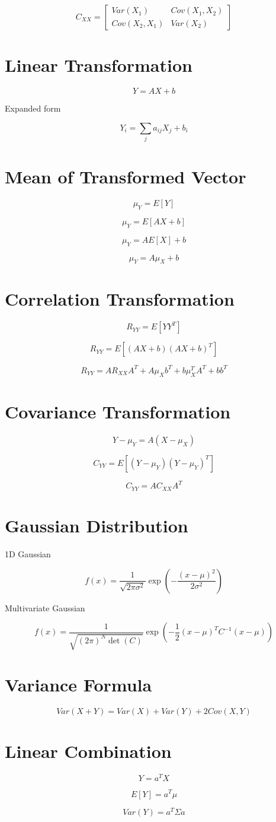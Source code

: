 \documentclass[12pt]{article}
\begin{document}
\[
C_{XX} =
\begin{bmatrix}
Var(X_1) & Cov(X_1,X_2) \\
Cov(X_2,X_1) & Var(X_2)
\end{bmatrix}
\]

\section{Linear Transformation}

\[
Y = AX + b
\]

Expanded form

\[
Y_i = \sum_j a_{ij} X_j + b_i
\]

\section{Mean of Transformed Vector}

\[
\mu_Y = E[Y]
\]

\[
\mu_Y = E[AX+b]
\]

\[
\mu_Y = A E[X] + b
\]

\[
\mu_Y = A \mu_X + b
\]

\section{Correlation Transformation}

\[
R_{YY} = E[YY^T]
\]

\[
R_{YY}
=
E[(AX+b)(AX+b)^T]
\]

\[
R_{YY}
=
A R_{XX} A^T
+
A \mu_X b^T
+
b \mu_X^T A^T
+
bb^T
\]

\section{Covariance Transformation}

\[
Y - \mu_Y = A(X-\mu_X)
\]

\[
C_{YY}
=
E[(Y-\mu_Y)(Y-\mu_Y)^T]
\]

\[
C_{YY}
=
A C_{XX} A^T
\]

\section{Gaussian Distribution}

1D Gaussian

\[
f(x) =
\frac{1}{\sqrt{2\pi\sigma^2}}
\exp
\left(
-\frac{(x-\mu)^2}{2\sigma^2}
\right)
\]

Multivariate Gaussian

\[
f(x)
=
\frac{1}
{\sqrt{(2\pi)^N \det(C)}}
\exp
\left(
-\frac12
(x-\mu)^T
C^{-1}
(x-\mu)
\right)
\]

\section{Variance Formula}

\[
Var(X+Y)
=
Var(X)+Var(Y)+2Cov(X,Y)
\]

\section{Linear Combination}

\[
Y = a^T X
\]

\[
E[Y] = a^T \mu
\]

\[
Var(Y) = a^T \Sigma a
\]
\end{document}

